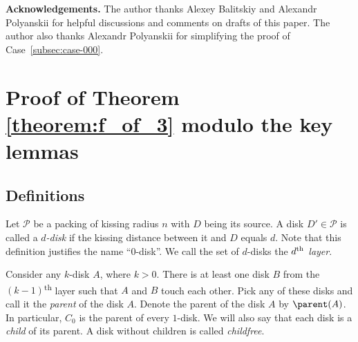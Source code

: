 \medskip \textbf{Acknowledgements.}
The author thanks Alexey Balitskiy and Alexandr Polyanskii for helpful discussions and comments on drafts of this paper. The author also thanks Alexandr Polyanskii for simplifying the proof of Case~\ref{subsec:case-000}.

\section{Proof of Theorem \ref{theorem:f_of_3} modulo the key lemmas}



\subsection{Definitions}

Let $\mathcal{P}$ be a packing of kissing radius $n$ with $D$ being its source. A disk $D' \in \mathcal{P}$ is called a \textit{$d$-disk} if the kissing distance between it and $D$ equals $d$. Note that this definition justifies the name ``0-disk''. We call the set of $d$-disks the \textit{$d\textsuperscript{th}$ layer}. %

Consider any $k$-disk $A$, where $k > 0$. There is at least one disk $B$ from the $(k-1)$\textsuperscript{th} layer such that $A$ and $B$ touch each other. Pick any of these disks and call it the \textit{parent} of the disk $A$.
Denote the parent of the disk $A$ by $\parent(A)$.
In particular, $C_0$ is the parent of every $1$-disk. We will also say that each disk is a \emph{child} of its parent. A disk without children is called \emph{childfree}.

